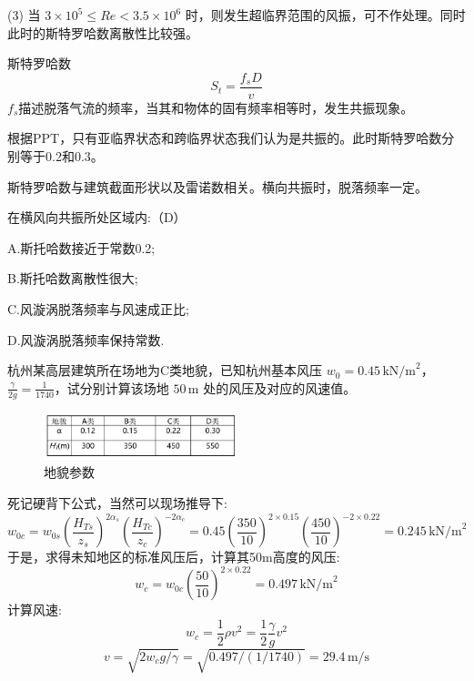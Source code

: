 \documentclass[12pt, a4paper, oneside, UTF8]{ctexbook}
\begin{document}
(3) 当 $3 \times 10^5 \leq Re < 3.5 \times 10^6$ 时，则发生超临界范围的风振，可不作处理。{\color{red}同时此时的斯特罗哈数离散性比较强}。

\begin{definition}
    斯特罗哈数
    \[
    S_t = \frac{f_sD}{v}
    \]
    $f_s$描述脱落气流的频率，当其和物体的固有频率相等时，发生共振现象。
\end{definition}

\begin{remark}
    根据PPT，只有亚临界状态和跨临界状态我们认为是共振的。此时斯特罗哈数分别等于0.2和0.3。
    
    斯特罗哈数与建筑截面形状以及雷诺数相关。横向共振时，脱落频率一定。
\end{remark}

\begin{example}
    在横风向共振所处区域内:（D）

    A.斯托哈数接近于常数0.2; 

    B.斯托哈数离散性很大;

    C.风漩涡脱落频率与风速成正比; 

    D.风漩涡脱落频率保持常数.
\end{example}

\begin{example}
    杭州某高层建筑所在场地为C类地貌，已知杭州基本风压 $w_0 = 0.45\,\mathrm{kN/m}^2$，$\frac{\gamma}{2g} = \frac{1}{1740}$，试分别计算该场地 $50\,\mathrm{m}$ 处的风压及对应的风速值。

    \begin{figure}[H]
        \centering
        \includegraphics[width=0.5\textwidth]{../figure/3.png}
        \caption{地貌参数}
    \end{figure}

    死记硬背下公式，当然可以现场推导下:
    \[
    w_{0c} = w_{0s} \left( \frac{H_{Ts}}{z_s} \right)^{2\alpha_s} \left( \frac{H_{Tc}}{z_c} \right)^{-2\alpha_c}=0.45 \left( \frac{350}{10} \right)^{2 \times 0.15} \left( \frac{450}{10} \right)^{-2 \times 0.22} = 0.245 \,\mathrm{kN/m}^2
    \]
    于是，求得未知地区的标准风压后，计算其50m高度的风压:
    \[
    w_c = w_{0c} (\frac{50}{10})^{2 \times 0.22}=0.497\,\mathrm{kN/m}^2
    \]
    计算风速:
    \[
    w_c = \frac{1}{2} \rho v^2 = \frac{1}{2} \frac{\gamma}{g} v^2
    \]
    \[
    v = \sqrt{2 w_c g / \gamma} = \sqrt{0.497  / (1/1740)} = 29.4\,\mathrm{m/s}
    \]
\end{example}
\end{document}
